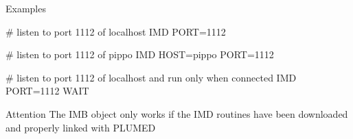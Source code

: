 \begin{DoxyParagraph}{Examples}

\end{DoxyParagraph}
\begin{DoxyVerb}# listen to port 1112 of localhost
IMD PORT=1112
\end{DoxyVerb}
 \begin{DoxyVerb}# listen to port 1112 of pippo
IMD HOST=pippo PORT=1112
\end{DoxyVerb}
 \begin{DoxyVerb}# listen to port 1112 of localhost and run only when connected
IMD PORT=1112 WAIT
\end{DoxyVerb}


\begin{DoxyAttention}{Attention}
The I\+M\+B object only works if the I\+M\+D routines have been downloaded and properly linked with P\+L\+U\+M\+E\+D 
\end{DoxyAttention}

